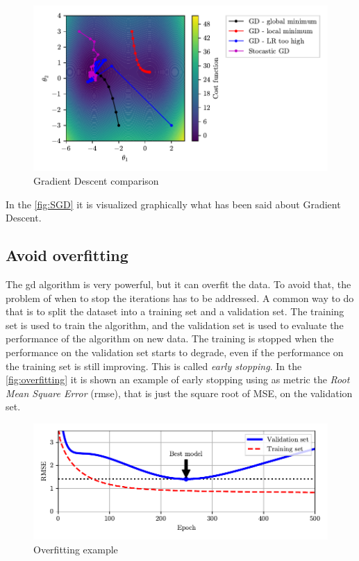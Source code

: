 \begin{figure}
    \centering
    \includegraphics[width=\textwidth]{images/MachineLearning/GradientDescent.pdf}
    \caption{Gradient Descent comparison}
    \label{fig:SGD}
\end{figure}

In the \autoref{fig:SGD} it is visualized graphically what has been said about Gradient Descent.

\subsection{Avoid overfitting}
\label{subsec:overfitting}
The \gls{gd} algorithm is very powerful, but it can overfit the data. To avoid that, the problem of when to stop the iterations has to be addressed. A common way to do that is to split the dataset into a training set and a validation set. The training set is used to train the algorithm, and the validation set is used to evaluate the performance of the algorithm on new data. The training is stopped when the performance on the validation set starts to degrade, even if the performance on the training set is still improving. This is called \emph{early stopping}. In the \autoref{fig:overfitting} it is shown an example of early stopping using as metric the \emph{Root Mean Square Error} (\gls{rmse}), that is just the square root of MSE, on the validation set.

\begin{figure}
    \centering
    \includegraphics[width=\textwidth]{images/MachineLearning/EarlyStopping.pdf}
    \caption{Overfitting example }
    \label{fig:overfitting}
\end{figure}

